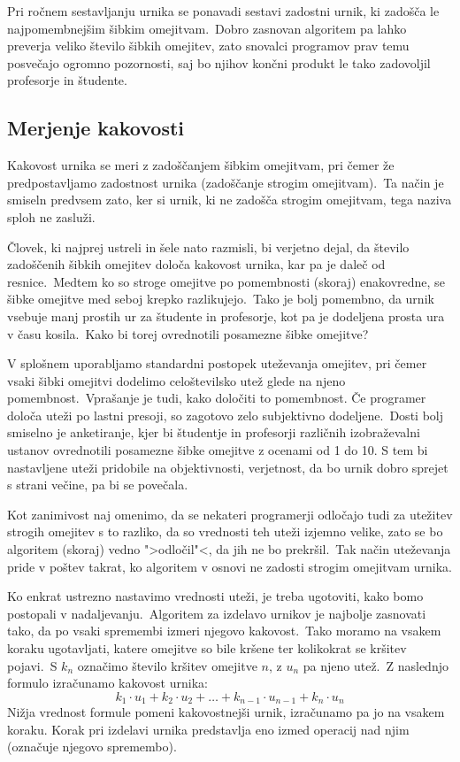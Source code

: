 \documentclass[a4paper,10pt]{article}
\begin{document}
Pri ročnem sestavljanju urnika se ponavadi sestavi zadostni urnik, ki zadošča le
najpomembnejšim šibkim omejitvam.\ Dobro zasnovan algoritem pa lahko preverja veliko
število šibkih omejitev, zato snovalci programov prav temu posvečajo ogromno pozornosti,
saj bo njihov končni produkt le tako zadovoljil profesorje in študente.

\subsection{Merjenje kakovosti}

Kakovost urnika se meri z zadoščanjem šibkim omejitvam, pri čemer že predpostavljamo
zadostnost urnika (zadoščanje strogim omejitvam).\ Ta način je smiseln predvsem zato,
ker si urnik, ki ne zadošča strogim omejitvam, tega naziva sploh ne zasluži.

Človek, ki najprej ustreli in šele nato razmisli, bi verjetno dejal, da število
zadoščenih šibkih omejitev določa kakovost urnika, kar pa je daleč od resnice.\ Medtem
ko so stroge omejitve po pomembnosti (skoraj) enakovredne, se šibke omejitve med seboj
krepko razlikujejo.\ Tako je bolj pomembno, da urnik vsebuje manj prostih ur za
študente in profesorje, kot pa je dodeljena prosta ura v času kosila.\ Kako bi torej
ovrednotili posamezne šibke omejitve?

V splošnem uporabljamo standardni postopek uteževanja omejitev, pri čemer vsaki šibki
omejitvi dodelimo celoštevilsko utež glede na njeno pomembnost.\ Vprašanje je tudi, kako
določiti to pomembnost. Če programer določa uteži po lastni presoji, so zagotovo zelo
subjektivno dodeljene.\ Dosti bolj smiselno je anketiranje, kjer bi študentje in profesorji
različnih izobraževalni ustanov ovrednotili posamezne šibke omejitve z ocenami od 1 do 10.
S tem bi nastavljene uteži pridobile na objektivnosti, verjetnost, da bo urnik dobro
sprejet s strani večine, pa bi se povečala.

Kot zanimivost naj omenimo, da se nekateri programerji odločajo tudi za utežitev strogih
omejitev s to razliko, da so vrednosti teh uteži izjemno velike, zato se bo algoritem
(skoraj) vedno ">odločil"<, da jih ne bo prekršil.\ Tak način uteževanja pride v poštev
takrat, ko algoritem v osnovi ne zadosti strogim omejitvam urnika.

Ko enkrat ustrezno nastavimo vrednosti uteži, je treba ugotoviti, kako bomo postopali
v nadaljevanju.\ Algoritem za izdelavo urnikov je najbolje zasnovati tako, da po vsaki
spremembi izmeri njegovo kakovost.\ Tako moramo na vsakem koraku ugotavljati, katere
omejitve so bile kršene ter kolikokrat se kršitev pojavi.\ S \(k_n\) označimo število
kršitev omejitve \(n\), z \(u_n\) pa njeno utež.\ Z naslednjo formulo izračunamo
kakovost urnika:
\[
  k_1 \cdot u_1 + k_2 \cdot u_2 + \ldots
  + k_{n-1} \cdot u_{n-1} + k_n \cdot u_n
\]
Nižja vrednost formule pomeni kakovostnejši urnik, izračunamo pa jo na vsakem koraku.
Korak pri izdelavi urnika predstavlja eno izmed operacij nad njim (označuje njegovo
spremembo).
\end{document}
